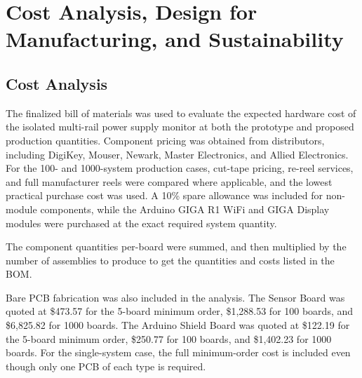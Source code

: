 \chapter{Cost Analysis, Design for Manufacturing, and Sustainability}
\label{chap:cost-dfm-sustainability}

\begin{weekthreechange}
    \section{Cost Analysis}
    The finalized bill of materials was used to evaluate the expected hardware cost
    of the isolated multi-rail power supply monitor at both the prototype and proposed production quantities. Component pricing was obtained from distributors, including DigiKey, Mouser, Newark, Master Electronics, and Allied Electronics. For the 100- and 1000-system production cases, cut-tape pricing, re-reel services, and full manufacturer reels were compared where applicable, and the lowest practical purchase cost was used. A 10\% spare allowance was included for non-module components, while the Arduino GIGA R1 WiFi and GIGA Display modules were purchased at the exact required system quantity.

    The component quantities per-board were summed, and then multiplied by the number of assemblies to produce to get the quantities and costs listed in the BOM.

    Bare PCB fabrication was also included in the analysis. The Sensor Board was quoted at \$473.57 for the 5-board minimum order, \$1,288.53 for 100 boards, and \$6,825.82 for 1000 boards. The Arduino Shield Board was quoted at \$122.19 for the 5-board minimum order, \$250.77 for 100 boards, and \$1,402.23 for 1000 boards. For the single-system case, the full minimum-order cost is included even though only one PCB of each type is required.

    \begin{table}[H]
        \centering
        \caption{Estimated Hardware Cost Versus Production Quantity}
        \label{tab:system-production-cost}
\end{table}
\end{weekthreechange}
